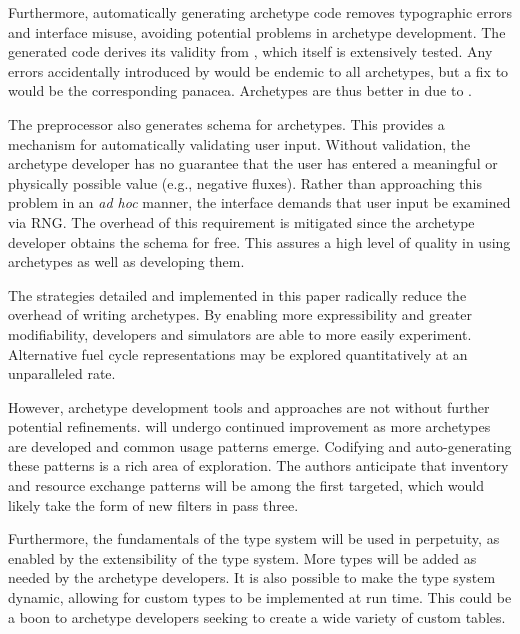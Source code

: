 Furthermore, automatically generating archetype code removes typographic errors and 
\cyclus interface misuse, avoiding potential problems in archetype development. The 
generated code derives its validity from \cycpp, which itself is extensively 
tested. Any errors accidentally introduced by \cycpp would be endemic to all archetypes, 
but a fix to \cycpp would be the corresponding panacea. Archetypes are thus 
better in \cyclus due to \cycpp.

The preprocessor also generates schema for archetypes. This provides a mechanism 
for automatically validating user input.  Without validation, the archetype 
developer has no guarantee that the user has entered a meaningful or physically possible 
value (e.g., negative fluxes). Rather than approaching this problem in an
\emph{ad hoc} 
manner, the \cyclus interface demands that user input be examined via \acrlong{RNG}.  The overhead 
of this requirement is mitigated since the archetype developer obtains the schema
for free. This assures a high level of quality in using archetypes as well as 
developing them.

The strategies detailed and implemented in this paper radically
reduce the overhead of writing archetypes. By enabling more expressibility and greater
modifiability, developers and simulators are able to more easily experiment.  
Alternative fuel cycle representations may be explored quantitatively at an
unparalleled rate.

However, archetype development tools and approaches are not without further 
potential refinements. \cycpp will undergo continued improvement 
as more archetypes are developed and common usage patterns emerge. Codifying and 
auto-generating these patterns is a rich area of exploration. The authors anticipate 
that inventory and resource exchange patterns will be among the first
targeted, 
which would likely take the form of new filters in pass three.

Furthermore, the fundamentals of the \cyclus type system will be used in 
perpetuity, as enabled by the extensibility of the type system.  More types
will be added as needed by the archetype developers.  It is also possible to 
make the type system dynamic, allowing for custom types to be implemented at run time.
This could be a boon to archetype developers seeking to create a wide variety of custom
tables.

